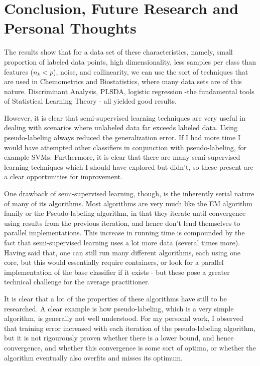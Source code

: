 \documentclass[conference,final,]{IEEEtran}
\begin{document}
\hypertarget{conclusion-future-research-and-personal-thoughts}{%
\section{Conclusion, Future Research and Personal
Thoughts}\label{conclusion-future-research-and-personal-thoughts}}

The results show that for a data set of these characteristics, namely,
small proportion of labeled data points, high dimensionality, less
samples per class than features (\(n_k<p\)), noise, and collinearity, we
can use the sort of techniques that are used in Chemometrics and
Biostatistics, where many data sets are of this nature. Discriminant
Analysis, PLSDA, logistic regression -the fundamental tools of
Statistical Learning Theory - all yielded good results.

However, it is clear that semi-supervised learning techniques are very
useful in dealing with scenarios where unlabeled data far exceeds
labeled data. Using pseudo-labeling always reduced the generalization
error. If I had more time I would have attempted other classifiers in
conjunction with pseudo-labeling, for example SVMs. Furthermore, it is
clear that there are many semi-supervised learning techniques which I
should have explored but didn't, so these present are a clear
opportunities for improvement.

One drawback of semi-supervised learning, though, is the inherently
serial nature of many of its algorithms. Most algorithms are very much
like the EM algorithm family or the Pseudo-labeling algorithm, in that
they iterate until convergence using results from the previous
iteration, and hence don't lend themselves to parallel implementations.
This increase in running time is compounded by the fact that
semi-supervised learning uses a lot more data (several times more).
Having said that, one can still run many different algorithms, each
using one core, but this would essentially require containers, or look
for a parallel implementation of the base classifier if it exists - but
these pose a greater technical challenge for the average practitioner.

It is clear that a lot of the properties of these algorithms have still
to be researched. A clear example is how pseudo-labeling, which is a
very simple algorithm, is generally not well understood. For my personal
work, I observed that training error increased with each iteration of
the pseudo-labeling algorithm, but it is not rigourously proven whether
there is a lower bound, and hence convergence, and whether this
convergence is some sort of optima, or whether the algorithm eventually
also overfits and misses its optimum.
\end{document}

